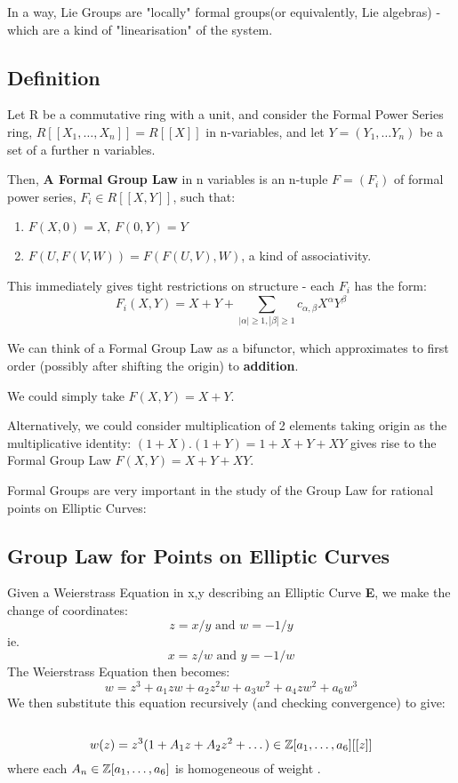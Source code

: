 In a way, Lie Groups are "locally" formal groups(or equivalently,
Lie algebras) - which are a kind of "linearisation" of the system.

\subsection*{Definition}
Let R be a commutative ring with a unit, and consider the Formal
Power Series ring, $R[[X_1, \dots ,X_n]] = R[[X]]$ in n-variables,
and let $Y= (Y_1, \dots Y_n)$ be a set of a further n variables.

Then, \textbf{A Formal Group Law} in n variables is an n-tuple $F
= (F_i )$ of formal power series, $F_i \in R[[X,Y]]$, such that:

\begin{enumerate}
    \item $F(X,0) = X,\, F(0,Y) = Y$
    \item $F(U, F(V,W)) = F(F(U,V),W)$, a kind of associativity.
\end{enumerate}

This immediately gives tight restrictions on structure - each
$F_i$ has the form:
$$F_i(X,Y) = X + Y +\sum_{|\alpha|\geq 1, |\beta|\geq 1}
c_{\alpha, \beta} X^\alpha Y^\beta$$

We can think of a Formal Group Law as a bifunctor, which
approximates to first order (possibly after shifting the origin)
to \textbf{addition}.

We could simply take $F(X,Y) = X+Y$.

Alternatively, we could consider multiplication of 2 elements
taking origin as the multiplicative identity: $(1+X).(1+Y) = 1+X +
Y + XY$ gives rise to the Formal Group Law $F(X,Y) = X+ Y +XY$.

Formal Groups are very important in the study of the Group Law for
rational points on Elliptic Curves:


\subsection{Group Law for Points on Elliptic
Curves}\label{df2.3.1} Given a Weierstrass Equation in x,y
describing an Elliptic Curve \textbf E, we make the change of
coordinates:
$$z=x/y\text{ and } w=-1/y$$
ie.
$$x=z/w\text{ and } y=-1/w$$
The Weierstrass Equation then becomes:
$$w=z^3 +a_1 zw +a_2 z^2 w + a_3 w^2 +a_4 z w^2 +a_6 w^3$$
We then substitute this equation recursively (and checking
convergence) to give:
\subsection{}\label{df2.3.2}
$$ w(z) = z^3 (1+A_1 z +A_2 z^2 + \dots)\in \mathbb Z [a_1, \dots ,
a_6][[z]]$$ where each $A_n \in \mathbb Z [a_1, \dots , a_6]$ is
homogeneous of weight .


